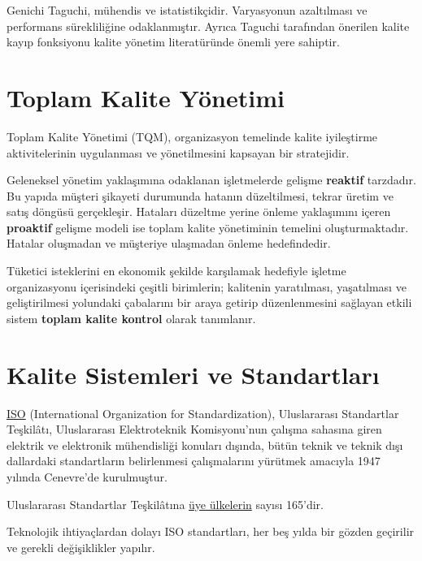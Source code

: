 \documentclass[
]{book}
\begin{document}
Genichi Taguchi, mühendis ve istatistikçidir. Varyasyonun azaltılması ve performans sürekliliğine odaklanmıştır. Ayrıca Taguchi tarafından önerilen kalite kayıp fonksiyonu kalite yönetim literatüründe önemli yere sahiptir.

\hypertarget{toplam-kalite-yuxf6netimi}{%
\section{Toplam Kalite Yönetimi}\label{toplam-kalite-yuxf6netimi}}

Toplam Kalite Yönetimi (TQM), organizasyon temelinde kalite iyileştirme aktivitelerinin uygulanması ve yönetilmesini kapsayan bir stratejidir.

Geleneksel yönetim yaklaşımına odaklanan işletmelerde gelişme \textbf{reaktif} tarzdadır. Bu yapıda müşteri şikayeti durumunda hatanın düzeltilmesi, tekrar üretim ve satış döngüsü gerçekleşir. Hataları düzeltme yerine önleme yaklaşımını içeren \textbf{proaktif} gelişme modeli ise toplam kalite yönetiminin temelini oluşturmaktadır. Hatalar oluşmadan ve müşteriye ulaşmadan önleme hedefindedir.

Tüketici isteklerini en ekonomik şekilde karşılamak hedefiyle işletme organizasyonu içerisindeki çeşitli birimlerin; kalitenin yaratılması, yaşatılması ve geliştirilmesi yolundaki çabalarını bir araya getirip düzenlenmesini sağlayan etkili sistem \textbf{toplam kalite kontrol} olarak tanımlanır.

\hypertarget{kalite-sistemleri-ve-standartlarux131}{%
\section{Kalite Sistemleri ve Standartları}\label{kalite-sistemleri-ve-standartlarux131}}

\href{https://www.iso.org/home.html}{ISO} (International Organization for Standardization), Uluslararası Standartlar Teşkilâtı, Uluslararası Elektroteknik Komisyonu'nun çalışma sahasına giren elektrik ve elektronik mühendisliği konuları dışında, bütün teknik ve teknik dışı dallardaki standartların belirlenmesi çalışmalarını yürütmek amacıyla 1947 yılında Cenevre'de kurulmuştur.

Uluslararası Standartlar Teşkilâtına \href{https://www.iso.org/members.html}{üye ülkelerin} sayısı 165'dir.

Teknolojik ihtiyaçlardan dolayı ISO standartları, her beş yılda bir gözden geçirilir ve gerekli değişiklikler yapılır.
\end{document}
